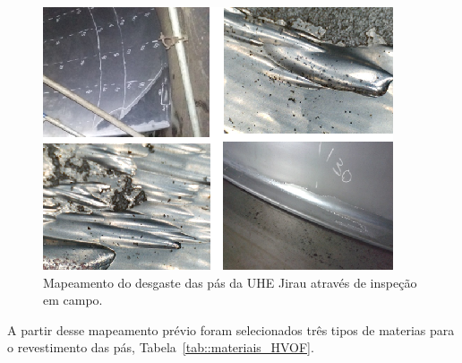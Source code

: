 \begin{figure}[h!]
	\centering
	\includegraphics[width=0.9\columnwidth]{sota/figs/projeto/proj_hvof_5.png}
    \caption{Mapeamento do desgaste das pás da UHE Jirau através de inspeção em campo.}
    \label{fig:proj_hvof_5}
\end{figure}

A partir desse mapeamento prévio foram selecionados três tipos de materias para
o revestimento das pás, Tabela~\ref{tab::materiais_HVOF}.

